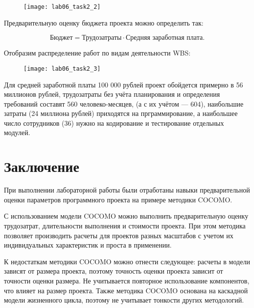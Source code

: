 \begin{figure}[h!]
	\texttt{[image: lab06\_task2\_2]}
\end{figure}

Предварительную оценку бюджета проекта можно определить так:

\begin{equation}
	\text{Бюджет} = \text{Трудозатраты}\cdot\text{Средняя заработная плата}.
\end{equation}

Отобразим распределение работ по видам деятельности WBS:
\begin{figure}[h!]
	\texttt{[image: lab06\_task2\_3]}
\end{figure}

Для средней заработной платы 100 000 рублей проект обойдется примерно в 56 миллионов рублей, трудозатраты без учёта планирования и определения требований составят 560 человеко-месяцев, (а с их учётом --- 604), наибольшие затраты (24 миллиона рублей) приходятся на прграммирование, а наибольшее число сотрудников (36) нужно на кодирование и тестирование отдельных модулей. 

\section*{Заключение}

При выполнении лабораторной работы были отработаны навыки предварительной оценки параметров программного проекта на примере методики COCOMO.

С использованием модели COCOMO можно выполнить предварительную оценку трудозатрат, длительности выполнения и стоимости проекта. При этом методика позволяет производить расчеты для проектов разных масштабов с учетом их индивидуальных характеристик и проста в применении. 

К недостаткам методики COCOMO можно отнести следующее: расчеты в модели зависят от размера проекта, поэтому точность оценки проекта зависит от точности оценки размера. Не учитывается повторное использование компонентов, что влияет на размер проекта. Также методика COCOMO основана на каскадной модели жизненного цикла, поэтому не учитывает тонкости других методологий.
